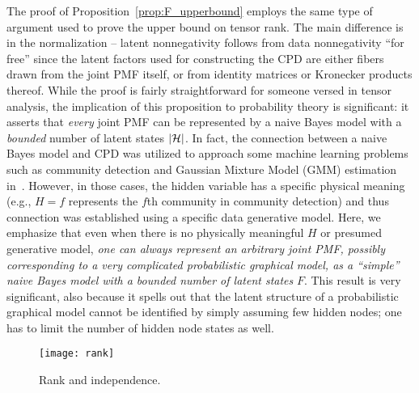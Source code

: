 \documentclass[journal]{IEEEtran}
\begin{document}
\begin{shaded*}
The proof of Proposition~\ref{prop:F_upperbound} employs the same type of argument used to prove the upper bound on tensor rank. The main difference is in the normalization -- latent nonnegativity follows from data nonnegativity ``for free'' {since the latent factors used for constructing the CPD are either fibers drawn from the joint PMF itself, or from identity matrices or Kronecker products thereof}. While the proof is fairly straightforward for someone versed in tensor analysis, the implication of this proposition to probability theory is significant: it asserts that \emph{every} joint PMF can be represented by a naive Bayes model with a \emph{bounded} number of latent states $|{\cal H}|$. In fact, the connection between a naive Bayes model and CPD was utilized to approach some machine learning problems such as community detection and Gaussian Mixture Model (GMM) estimation in~\cite{AnGeHsu2014a}. However, in those cases, the hidden variable has a specific physical meaning (e.g., $H=f$ represents the $f$th community in community detection) and thus connection was established using a specific data generative model. Here, we emphasize that even when there is no physically meaningful $H$ or presumed generative model, {\em one can always represent an arbitrary joint PMF, possibly corresponding to a very complicated probabilistic graphical model, as a ``simple'' naive Bayes model with a bounded number of latent states} $F$. This result is very significant, also because it spells out that the latent structure of a probabilistic graphical model cannot be identified by simply assuming few hidden nodes; one has to limit the number of hidden node states as well.
\end{shaded*}

\begin{figure}[!t]
\centering
\texttt{[image: rank]}
\caption{Rank and independence.}
\label{fig:rank_ind}
\end{figure}
\end{document}
